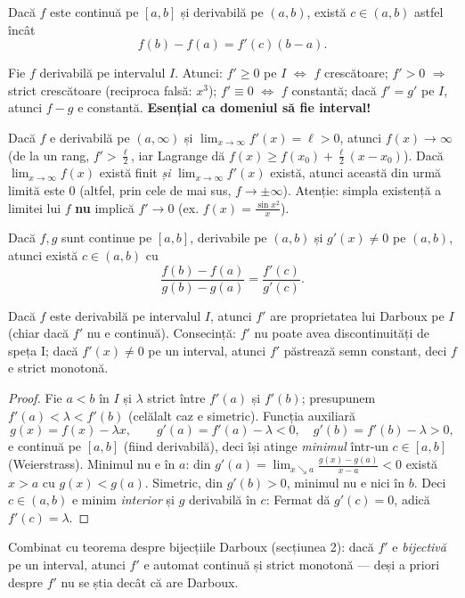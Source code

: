 \begin{teorema}
Dacă $f$ este continuă pe $[a,b]$ și derivabilă pe $(a,b)$, există $c\in(a,b)$ astfel încât
\[
f(b)-f(a)=f'(c)(b-a).
\]
\end{teorema}

\begin{corolar}
Fie $f$ derivabilă pe intervalul $I$. Atunci: $f'\ge 0$ pe $I$ $\iff$ $f$ crescătoare; $f'>0$ $\Rightarrow$ strict crescătoare (reciproca falsă: $x^3$); $f'\equiv 0$ $\iff$ $f$ constantă; dacă $f'=g'$ pe $I$, atunci $f-g$ e constantă. \textbf{Esențial ca domeniul să fie interval!}
\end{corolar}

\begin{obs}
Dacă $f$ e derivabilă pe $(a,\infty)$ și $\lim_{x\to\infty}f'(x)=\ell>0$, atunci $f(x)\to\infty$ (de la un rang, $f'>\frac\ell2$, iar Lagrange dă $f(x)\ge f(x_0)+\frac\ell2(x-x_0)$). Dacă $\lim_{x\to\infty}f(x)$ există finit \emph{și} $\lim_{x\to\infty}f'(x)$ există, atunci această din urmă limită este $0$ (altfel, prin cele de mai sus, $f\to\pm\infty$). Atenție: simpla existență a limitei lui $f$ \textbf{nu} implică $f'\to0$ (ex. $f(x)=\frac{\sin x^2}{x}$).
\end{obs}

\begin{teorema}
Dacă $f,g$ sunt continue pe $[a,b]$, derivabile pe $(a,b)$ și $g'(x) \neq 0$ pe $(a,b)$, atunci există $c\in(a,b)$ cu
\[
\frac{f(b)-f(a)}{g(b)-g(a)}=\frac{f'(c)}{g'(c)}.
\]
\end{teorema}

\begin{teorema}\label{darbderiv}
Dacă $f$ este derivabilă pe intervalul $I$, atunci $f'$ are proprietatea lui Darboux pe $I$ (chiar dacă $f'$ nu e continuă). Consecință: $f'$ nu poate avea discontinuități de speța I; dacă $f'(x) \neq 0$ pe un interval, atunci $f'$ păstrează semn constant, deci $f$ e strict monotonă.
\end{teorema}
\begin{proof}
Fie $a<b$ în $I$ și $\lambda$ strict între $f'(a)$ și $f'(b)$; presupunem $f'(a)<\lambda<f'(b)$ (celălalt caz e simetric). Funcția auxiliară
\[
g(x)=f(x)-\lambda x,\qquad g'(a)=f'(a)-\lambda<0,\quad g'(b)=f'(b)-\lambda>0,
\]
e continuă pe $[a,b]$ (fiind derivabilă), deci își atinge \emph{minimul} într-un $c\in[a,b]$ (Weierstrass). Minimul nu e în $a$: din $g'(a)=\lim_{x\searrow a}\frac{g(x)-g(a)}{x-a}<0$ există $x>a$ cu $g(x)<g(a)$. Simetric, din $g'(b)>0$, minimul nu e nici în $b$. Deci $c\in(a,b)$ e minim \emph{interior} și $g$ derivabilă în $c$: Fermat dă $g'(c)=0$, adică $f'(c)=\lambda$.
\end{proof}
\begin{obs}
Combinat cu teorema despre bijecțiile Darboux (secțiunea 2): dacă $f'$ e \emph{bijectivă} pe un interval, atunci $f'$ e automat continuă și strict monotonă --- deși a priori despre $f'$ nu se știa decât că are Darboux.
\end{obs}

